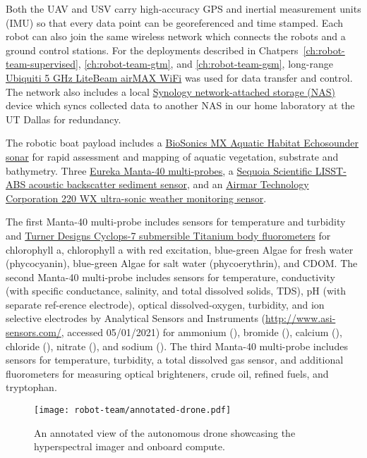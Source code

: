 Both the UAV and USV carry high-accuracy GPS and inertial
measurement units (IMU) so that every data point can be georeferenced and time
stamped. Each robot can also join the same wireless network which connects the
robots and a ground control stations. For the deployments described in
Chatpers~\ref{ch:robot-team-supervised}, \ref{ch:robot-team-gtm}, and
\ref{ch:robot-team-gsm}, long-range
\href{https://www.ui.com}{Ubiquiti 5 GHz LiteBeam airMAX WiFi} was used for
data transfer and control. The network
also includes a local \href{https://www.synology.com}{Synology network-attached
  storage (NAS)} device which syncs collected data to another NAS in our home laboratory at the
UT Dallas for redundancy.

The robotic boat payload includes a
\href{https://www.biosonicsinc.com/products/mx-aquatic-habitat-echosounder/}{BioSonics
  MX Aquatic Habitat Echosounder sonar} for rapid assessment and mapping of
aquatic vegetation, substrate and bathymetry. Three
\href{https://www.waterprobes.com/multiprobes-and-sondes-for-monitori}{Eureka
  Manta-40 multi-probes}, a
\href{https://www.sequoiasci.com/product/lisst-abs/}{Sequoia Scientific
  LISST-ABS acoustic backscatter sediment sensor}, and an
\href{https://www.airmar.com/weather-description.html?id=153}{Airmar Technology
  Corporation 220 WX ultra-sonic weather monitoring sensor}.

The first Manta-40 multi-probe includes sensors for temperature and turbidity
and
\href{https://www.turnerdesigns.com/cyclops-7f-submersible-fluorometer}{Turner
  Designs Cyclops-7 submersible Titanium body fluorometers} for chlorophyll a,
chlorophyll a with red excitation, blue-green Algae for fresh water
(phycocyanin), blue-green Algae for salt water (phycoerythrin), and CDOM.
The second Manta-40 multi-probe includes sensors for temperature, conductivity
(with specific conductance, salinity, and total dissolved solids, TDS), pH (with
separate ref-erence electrode), optical dissolved-oxygen, turbidity, and ion
selective electrodes by Analytical Sensors and Instruments
(\url{http://www.asi-sensors.com/}, accessed 05/01/2021) for ammonium
(), bromide (), calcium (), chloride (),
nitrate (), and sodium (). The third Manta-40 multi-probe
includes sensors for temperature, turbidity, a total dissolved gas sensor, and
additional fluorometers for measuring optical brighteners, crude oil, refined
fuels, and tryptophan.

\begin{figure}[!hbt]
  \centering
  \texttt{[image: robot-team/annotated-drone.pdf]}
  \caption{An annotated view of the autonomous drone showcasing the hyperspectral imager and onboard compute.}
  \label{fig:uav-closeup}
\end{figure}


